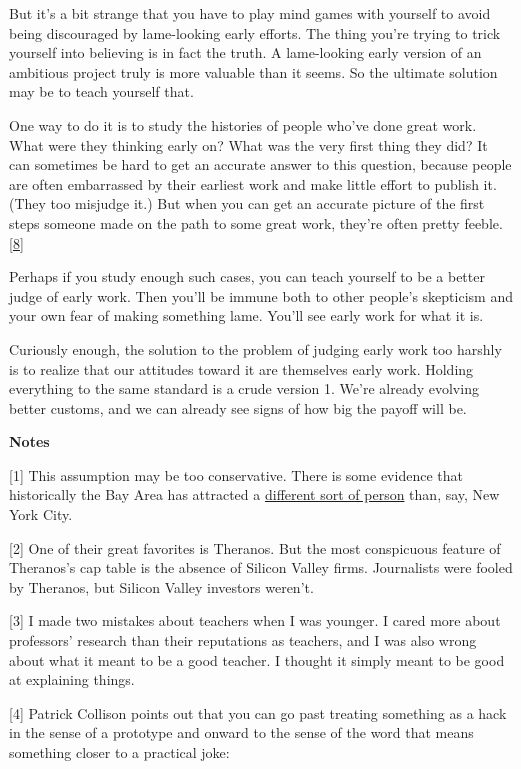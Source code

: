But it's a bit strange that you have to play mind games with yourself to
avoid being discouraged by lame-looking early efforts. The thing you're
trying to trick yourself into believing is in fact the truth. A
lame-looking early version of an ambitious project truly is more
valuable than it seems. So the ultimate solution may be to teach
yourself that.

One way to do it is to study the histories of people who've done great
work. What were they thinking early on? What was the very first thing
they did? It can sometimes be hard to get an accurate answer to this
question, because people are often embarrassed by their earliest work
and make little effort to publish it. (They too misjudge it.) But when
you can get an accurate picture of the first steps someone made on the
path to some great work, they're often pretty feeble.
{[}\hyperref[f8n]{8}{]}

Perhaps if you study enough such cases, you can teach yourself to be a
better judge of early work. Then you'll be immune both to other people's
skepticism and your own fear of making something lame. You'll see early
work for what it is.

Curiously enough, the solution to the problem of judging early work too
harshly is to realize that our attitudes toward it are themselves early
work. Holding everything to the same standard is a crude version 1.
We're already evolving better customs, and we can already see signs of
how big the payoff will be.

\textbf{Notes}

{[}1{]} This assumption may be too conservative. There is some evidence
that historically the Bay Area has attracted a
\href{cities.html}{different sort of person} than, say, New York City.

{[}2{]} One of their great favorites is Theranos. But the most
conspicuous feature of Theranos's cap table is the absence of Silicon
Valley firms. Journalists were fooled by Theranos, but Silicon Valley
investors weren't.

{[}3{]} I made two mistakes about teachers when I was younger. I cared
more about professors' research than their reputations as teachers, and
I was also wrong about what it meant to be a good teacher. I thought it
simply meant to be good at explaining things.

{[}4{]} Patrick Collison points out that you can go past treating
something as a hack in the sense of a prototype and onward to the sense
of the word that means something closer to a practical joke:

